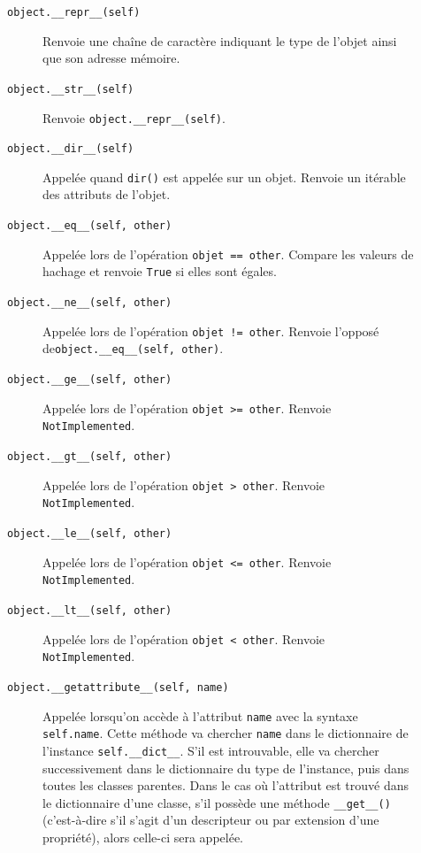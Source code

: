 \documentclass[a4paper, 10pt]{article}
\begin{document}
\begin{description}
\begin{description}
\begin{verbatim}
\end{verbatim}
        \item[\texttt{object.__repr__(self)}] Renvoie une chaîne de caractère indiquant le type de l'objet ainsi que son adresse mémoire.
        \item[\texttt{object.__str__(self)}] Renvoie \texttt{object.__repr__(self)}. 
        \item[\texttt{object.__dir__(self)}] Appelée quand \texttt{dir()} est appelée sur un objet. Renvoie un itérable des attributs de l'objet.
        \item[\texttt{object.__eq__(self, other)}] Appelée lors de l'opération \texttt{objet == other}. Compare les valeurs de hachage et renvoie \texttt{True} si elles sont égales.
        \item[\texttt{object.__ne__(self, other)}] Appelée lors de l'opération \texttt{objet != other}. Renvoie l'opposé de\break\texttt{object.__eq__(self, other)}.
        \item[\texttt{object.__ge__(self, other)}] Appelée lors de l'opération \texttt{objet >= other}. Renvoie \texttt{NotImplemented}.
        \item[\texttt{object.__gt__(self, other)}] Appelée lors de l'opération \texttt{objet > other}. Renvoie \texttt{NotImplemented}.
        \item[\texttt{object.__le__(self, other)}] Appelée lors de l'opération \texttt{objet <= other}. Renvoie \texttt{NotImplemented}.
        \item[\texttt{object.__lt__(self, other)}] Appelée lors de l'opération \texttt{objet < other}. Renvoie \texttt{NotImplemented}.
        \item[\texttt{object.__getattribute__(self, name)}] Appelée lorsqu'on accède à l'attribut \texttt{name} avec la syntaxe \texttt{self.name}. Cette méthode va chercher \texttt{name} dans le dictionnaire de l'instance \texttt{self.__dict__}. S'il est introuvable, elle
        va chercher successivement dans le dictionnaire du type de l'instance, puis dans toutes les classes parentes. Dans le cas où l'attribut est trouvé dans le dictionnaire d'une classe, s'il possède une méthode \texttt{__get__()} (c'est-à-dire s'il s'agit d'un descripteur ou par extension d'une propriété), alors celle-ci sera appelée. 

\end{description}
\end{description}
\end{document}
